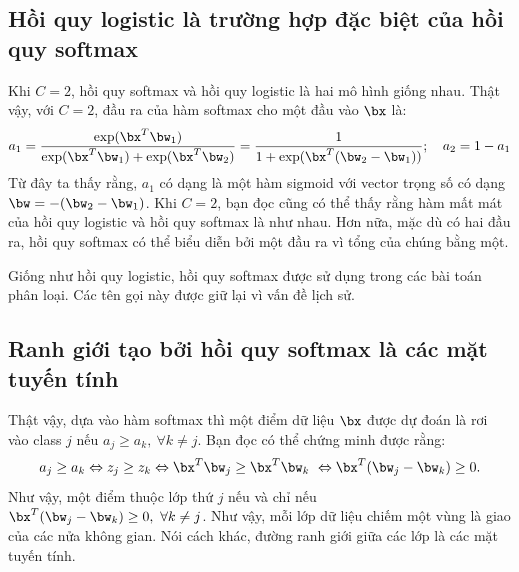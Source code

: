 \subsection{Hồi quy logistic là trường hợp đặc biệt của hồi quy softmax}

Khi $C = 2$, hồi quy softmax và hồi quy logistic là hai mô hình giống nhau. Thật vậy,
với $C = 2$, đầu ra của hàm softmax cho một đầu vào $\bx$ là:
\begin{equation}
a_1 = \frac{\exp(\bx^T\bw_1)} {\exp(\bx^T\bw_1) +
\exp(\bx^T\bw_2)}
= \frac{1}{1 + \exp(\bx^T(\bw_2 - \bw_1))};\quad a_2 = 1 -
a_1
\end{equation}
Từ đây ta thấy rằng, $a_1$ có dạng là một hàm sigmoid với vector trọng số có dạng $\bw =
-(\bw_2 - \bw_1)$.
Khi $C = 2$, bạn đọc cũng có thể thấy rằng hàm mất mát của hồi quy logistic
và hồi quy softmax là như nhau. Hơn nữa, mặc dù có hai đầu ra, hồi quy softmax có thể biểu diễn bởi một đầu ra vì tổng của chúng bằng một.

{Giống như hồi quy logistic, hồi quy softmax được sử dụng trong các bài toán
phân loại}. Các tên gọi này được giữ lại vì vấn đề lịch sử.


\subsection{Ranh giới tạo bởi hồi quy softmax là các mặt tuyến tính}
Thật vậy, dựa vào hàm softmax thì một điểm dữ liệu $\bx$ được dự đoán là rơi vào class $j$ nếu $a_{j} \geq a_{k}, ~\forall k \neq j$. Bạn đọc có thể chứng minh được rằng:
\begin{equation}
a_{j} \geq a_{k} \Leftrightarrow z_{j} \geq z_{k} \Leftrightarrow \bx^T\bw_j \geq \bx^T\bw_k\\\
\Leftrightarrow \bx^T(\bw_j - \bw_k) \geq 0.
\end{equation}
Như vậy, một điểm thuộc lớp thứ $j$ nếu và chỉ nếu $\bx^T(\bw_j - \bw_k) \geq
0,~\forall k \neq j$. Như vậy, mỗi lớp dữ liệu chiếm một vùng là giao
của các nửa không gian. Nói cách khác, đường ranh giới giữa các lớp là các
mặt tuyến tính.


